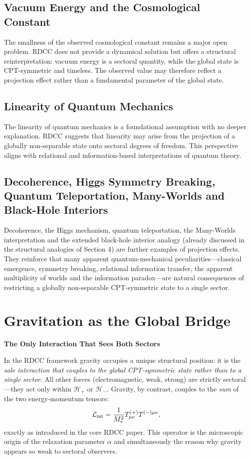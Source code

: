 \documentclass[11pt,a4paper]{article}
\begin{document}
\subsection{Vacuum Energy and the Cosmological Constant}

The smallness of the observed cosmological constant remains a major open problem. RDCC does not provide a dynamical solution but offers a structural reinterpretation: vacuum energy is a sectoral quantity, while the global state is CPT-symmetric and timeless. The observed value may therefore reflect a projection effect rather than a fundamental parameter of the global state.

\subsection{Linearity of Quantum Mechanics}

The linearity of quantum mechanics is a foundational assumption with no deeper explanation. RDCC suggests that linearity may arise from the projection of a globally non-separable state onto sectoral degrees of freedom. This perspective aligns with relational and information-based interpretations of quantum theory.

\subsection{Decoherence, Higgs Symmetry Breaking, Quantum Teleportation, Many-Worlds and Black-Hole Interiors}

Decoherence, the Higgs mechanism, quantum teleportation, the Many-Worlds interpretation and the extended black-hole interior analogy (already discussed in the structural analogies of Section 4) are further examples of projection effects. They reinforce that many apparent quantum-mechanical peculiarities—classical emergence, symmetry breaking, relational information transfer, the apparent multiplicity of worlds and the information paradox—are natural consequences of restricting a globally non-separable CPT-symmetric state to a single sector.

\section{Gravitation as the Global Bridge}
\textbf{The Only Interaction That Sees Both Sectors}

In the RDCC framework gravity occupies a unique structural position: it is the \emph{sole interaction that couples to the global CPT-symmetric state rather than to a single sector}. All other forces (electromagnetic, weak, strong) are strictly sectoral---they act only within $\mathcal{H}_+$ or $\mathcal{H}_-$. Gravity, by contrast, couples to the \emph{sum} of the two energy-momentum tensors:
\begin{equation}
\mathcal{L}_{\rm int} = \frac{1}{M_*^2} T^{(+)}_{\mu\nu} T^{(-)\mu\nu},
\label{eq:lint}
\end{equation}
exactly as introduced in the core RDCC paper. This operator is the microscopic origin of the relaxation parameter $\alpha$ and simultaneously the reason why gravity appears so weak to sectoral observers.
\end{document}
